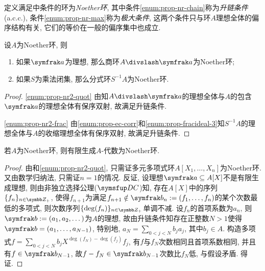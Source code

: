 定义满足中条件的环为\emph{Noether环}, 其中条件\ref{enum:prop-nr-chain}称为\emph{升链条件}(a.c.c.), 条件\ref{enum:prop-nr-max}称为\emph{极大条件}, 这两个条件只与环$A$理想全体的偏序结构有关, 它们的等价在一般的偏序集中也成立.

\begin{proposition}\label{prop:noetherring2}
    设$A$为Noether环, 则
    \begin{enumerate}
        \item\label{enum:prop-nr2-quot} 如果$\ideal{a}$为理想, 那么商环$A{\divslash}\ideal{a}$为Noether环;
        \item\label{enum:prop-nr2-frac} 如果$S$为乘法闭集, 那么分式环$S^{-1}A$为Noether环.
    \end{enumerate}
\end{proposition}

\begin{proof}
    \ref{enum:prop-nr2-quot} 由知$A{\divslash}\ideal{a}$的理想全体与$A$的包含$\ideal{a}$的理想全体有保序双射, 故满足升链条件.

    \ref{enum:prop-nr2-frac} 由\ref{enum:prop-ec-corr}和\ref{enum:prop-fracideal-3}知$S^{-1}A$的理想全体与$A$的收缩理想全体有保序双射, 故满足升链条件.
\end{proof}

\begin{theorem}
    若$A$为Noether环, 则有限生成$A$-代数为Noether环.
\end{theorem}

\begin{proof}
    由和\ref{enum:prop-nr2-quot}, 只需证多元多项式环$A[X_1, \dotsc, X_n]$为Noether环. 又由数学归纳法, 只需证$n=1$的情况. 反证, 设理想$\ideal{a}\subseteq A[X]$不是有限生成理想, 则由非独立选择公理($\axiom{DC}$)知, 存在$A[X]$中的序列$\{f_n\}_{n\in\ZZ_+}$, 使得$f_{n+1}$为满足$f_{n+1}\notin \ideal{b}_n:=(f_1, \dotsc, f_{n})$的某个次数最低的多项式, 则次数序列$\{\deg(f_n)\}_{n\in\ZZ_+}$单调不减. 设$f_n$的首项系数为$a_n$, 则$\ideal{b}:=(a_1, a_2, \dotsc)$为$A$的理想, 故由升链条件知存在正整数$N>1$使得$\ideal{b}=(a_1, \dotsc, a_{N-1})$, 特别地, $a_N=\sum_{0<j<N}b_ja_j$, 其中$b_j\in A$. 构造多项式$f=\sum_{0<j<N}b_jX^{\deg(f_N)-\deg(f_j)}f_j$, 有$f$与$f_N$次数相同且首项系数相同, 并且有$f\in\ideal{b}_{N-1}$, 故$f-f_N\in\ideal{b}_{N-1}$次数比$f_N$低, 与假设矛盾. 得证.
\end{proof}

